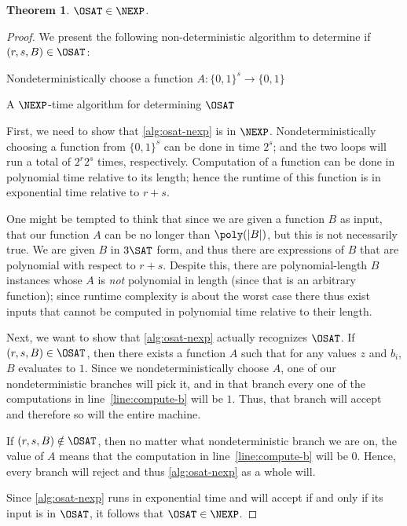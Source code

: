 \documentclass[english,12pt]{reedthesis}
\theoremstyle{plain}
\newtheorem{thm}{Theorem}[section]
\theoremstyle{definition}
\theoremstyle{remark}
\DeclarePairedDelimiter{\abs}{\lvert}{\rvert}
\begin{document}
\begin{thm}\label{thm:o3sat-in-nexp}
  $\OSAT \in \NEXP$.
\end{thm}

\begin{proof}
  We present the following non-deterministic algorithm to determine if
  $(r, s, B) \in \OSAT$:

  \begin{algorithm}[H]
    Nondeterministically choose a function $A\colon \{0, 1\}^{s} \rightarrow \{0, 1\}$\;
    \Accept\;
    \caption{A $\NEXP$-time algorithm for determining $\OSAT$}\label{alg:osat-nexp}
  \end{algorithm}

  First, we need to show that \cref{alg:osat-nexp} is in $\NEXP$.
  Nondeterministically choosing a function from $\{0, 1\}^{s}$ can be done in
  time $2^{s}$; and the two loops will run a total of $2^{r}2^{s}$ times,
  respectively. Computation of a function can be done in polynomial time
  relative to its length; hence the runtime of this function is in exponential
  time relative to $r + s$.

  One might be tempted to think that since we are given a function $B$ as input,
  that our function $A$ can be no longer than $\poly(\abs{B})$, but this is not
  necessarily true. We are given $B$ in $3\SAT$ form, and thus there are
  expressions of $B$ that are polynomial with respect to $r + s$. Despite this,
  there are polynomial-length $B$ instances whose $A$ is \emph{not} polynomial
  in length (since that is an arbitrary function); since runtime complexity is
  about the worst case there thus exist inputs that cannot be computed in
  polynomial time relative to their length.

  Next, we want to show that \cref{alg:osat-nexp} actually recognizes $\OSAT$.
  If $(r, s, B) \in \OSAT$, then there exists a function $A$ such that for any
  values $z$ and $b_{i}$, $B$ evaluates to $1$. Since we nondeterministically
  choose $A$, one of our nondeterministic branches will pick it, and in that
  branch every one of the computations in line~\ref{line:compute-b} will be $1$.
  Thus, that branch will accept and therefore so will the entire machine.

  If $(r, s, B) \notin \OSAT$, then no matter what nondeterministic branch we are on,
  the value of $A$ means that the computation in line~\ref{line:compute-b} will
  be $0$. Hence, every branch will reject and thus \cref{alg:osat-nexp} as a
  whole will.

  Since \cref{alg:osat-nexp} runs in exponential time and will accept if and
  only if its input is in $\OSAT$, it follows that $\OSAT \in \NEXP$.
\end{proof}
\end{document}
